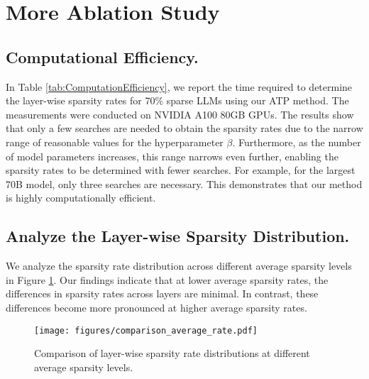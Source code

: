 \section{More Ablation Study}\label{sec:MoreAblationStudy}
\subsection{Computational Efficiency.}\label{sec:ComputationalEfficiency}
In Table \ref{tab:ComputationEfficiency}, we report the time required to determine the layer-wise sparsity rates for 70$\%$ sparse LLMs using our ATP method. The measurements were conducted on NVIDIA A100 80GB GPUs. The results show that only a few searches are needed to obtain the sparsity rates due to the narrow range of reasonable values for the hyperparameter \(\beta\). Furthermore, as the number of model parameters increases, this range narrows even further, enabling the sparsity rates to be determined with fewer searches. For example, for the largest 70B model, only three searches are necessary. This demonstrates that our method is highly computationally efficient.
\begin{table}[h!]
    \centering
    \caption{Computational efficiency of our ATP method (in minutes).}\label{tab:ComputationEfficiency}
\end{table}

\subsection{Analyze the Layer-wise Sparsity Distribution.}\label{sec:AnalyzeDistribution}
We analyze the sparsity rate distribution across different average sparsity levels in Figure \ref{fig:comparison_average_rate}. Our findings indicate that at lower average sparsity rates, the differences in sparsity rates across layers are minimal. In contrast, these differences become more pronounced at higher average sparsity rates.
\begin{figure}[htbp]
    \centering
    \texttt{[image: figures/comparison\_average\_rate.pdf]}
    \caption{Comparison of layer-wise sparsity rate distributions at different average sparsity levels.}
    \label{fig:comparison_average_rate}
\end{figure}


